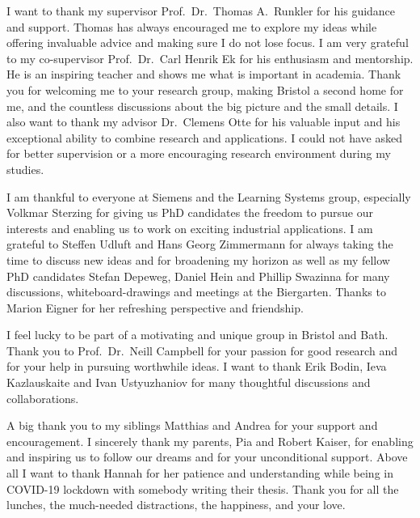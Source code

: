 \begin{Acknowledgements}
    I want to thank my supervisor Prof.~Dr.~Thomas A.~Runkler for his guidance and support.
    Thomas has always encouraged me to explore my ideas while offering invaluable advice and making sure I do not lose focus.
    I am very grateful to my co-supervisor Prof.~Dr.~Carl Henrik Ek for his enthusiasm and mentorship.
    He is an inspiring teacher and shows me what is important in academia.
    Thank you for welcoming me to your research group, making Bristol a second home for me, and the countless discussions about the big picture and the small details.
    I also want to thank my advisor Dr.~Clemens Otte for his valuable input and his exceptional ability to combine research and applications.
    I could not have asked for better supervision or a more encouraging research environment during my studies.

    I am thankful to everyone at Siemens and the Learning Systems group, especially Volkmar Sterzing for giving us PhD candidates the freedom to pursue our interests and enabling us to work on exciting industrial applications.
    I am grateful to Steffen Udluft and Hans Georg Zimmermann for always taking the time to discuss new ideas and for broadening my horizon as well as my fellow PhD candidates Stefan Depeweg, Daniel Hein and Phillip Swazinna for many discussions, whiteboard-drawings and meetings at the Biergarten.
    Thanks to Marion Eigner for her refreshing perspective and friendship.

    I feel lucky to be part of a motivating and unique group in Bristol and Bath.
    Thank you to Prof.~Dr.~Neill Campbell for your passion for good research and for your help in pursuing worthwhile ideas.
    I want to thank Erik Bodin, Ieva Kazlauskaite and Ivan Ustyuzhaniov for many thoughtful discussions and collaborations.

    A big thank you to my siblings Matthias and Andrea for your support and encouragement.
    I sincerely thank my parents, Pia and Robert Kaiser, for enabling and inspiring us to follow our dreams and for your unconditional support.
    Above all I want to thank Hannah for her patience and understanding while being in COVID-19 lockdown with somebody writing their thesis.
    Thank you for all the lunches, the much-needed distractions, the happiness, and your love.
\end{Acknowledgements}

\tableofcontents
